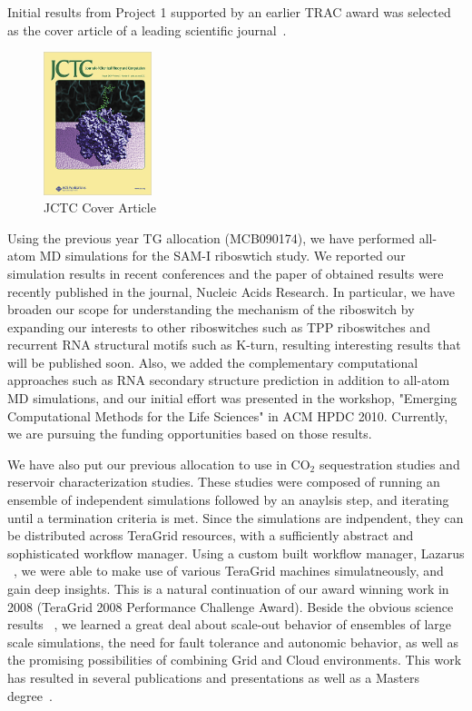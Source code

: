 \documentclass[a4paper,10pt]{article}
\begin{document}
Initial results from Project 1 supported by an earlier TRAC award was selected as the cover article of a leading scientific journal~\cite{jctc_cover}.
\begin{figure}
 \includegraphics[width=0.28\textwidth]{jctc_cover2.png}
 \caption{\footnotesize JCTC Cover Article}
 \label{cover}
\end{figure}
Using the previous year TG allocation (MCB090174), we have performed all-atom MD simulations for the SAM-I riboswtich study.  We reported our simulation results in recent conferences and the paper of obtained results were recently published in the journal, Nucleic Acids Research\cite{SAM-I-NAR2009}.  In particular, we have broaden our scope for understanding the mechanism of the riboswitch by expanding our interests to other riboswitches such as TPP riboswitches and recurrent RNA structural motifs such as K-turn, resulting interesting results that will be published soon.  Also, we added the complementary computational approaches such as RNA secondary structure prediction in addition to all-atom MD simulations, and our initial effort was presented in the workshop, "Emerging Computational Methods for the Life Sciences" in ACM HPDC 2010\cite{ecmls10}.  Currently, we are pursuing the funding opportunities based on those results.

We have also put our previous allocation to use in CO$_2$ sequestration studies
and reservoir characterization studies. These studies were composed of running an ensemble
of independent simulations followed by an anaylsis step, and iterating until a termination criteria is met.
Since the simulations are indpendent, they can be distributed across TeraGrid resources, with
a sufficiently abstract and sophisticated workflow manager. Using a custom built workflow manager,
Lazarus ~\cite{gmac}, we were able to make use of various TeraGrid machines simulatneously, and
gain deep insights. This is a natural continuation of our award winning work in 2008 (TeraGrid 2008 Performance Challenge Award). Beside the obvious science results ~\cite{TG10yye00}, we learned a great
deal about scale-out behavior of ensembles of large scale simulations, the need for fault
tolerance and autonomic behavior, as well as the promising possibilities of combining
Grid and Cloud environments. This work has resulted in several publications \cite{Cloud1,Cloud2,MSEScience,TG10yye00}  and presentations
as well as a Masters degree~\cite{Elkhamra2009}.
\end{document}
